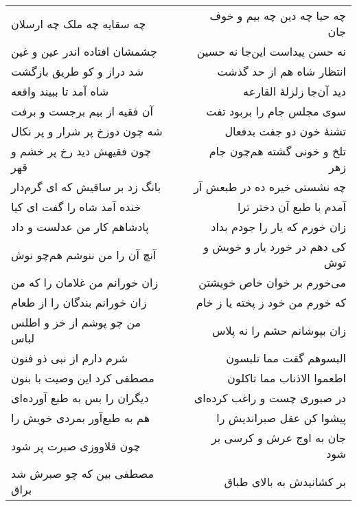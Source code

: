 \begin{center}
\begin{longtable}{l p{0.5cm} r}
چه سقایه چه ملک چه ارسلان
&&
چه حیا چه دین چه بیم و خوف جان
\\
چشمشان افتاده اندر عین و غین
&&
نه حسن پیداست این‌جا نه حسین
\\
شد دراز و کو طریق بازگشت
&&
انتظار شاه هم از حد گذشت
\\
شاه آمد تا ببیند واقعه
&&
دید آن‌جا زلزلهٔ القارعه
\\
آن فقیه از بیم برجست و برفت
&&
سوی مجلس جام را بربود تفت
\\
شه چون دوزخ پر شرار و پر نکال
&&
تشنهٔ خون دو جفت بدفعال
\\
چون فقیهش دید رخ پر خشم و قهر
&&
تلخ و خونی گشته هم‌چون جام زهر
\\
بانگ زد بر ساقیش که ای گرم‌دار
&&
چه نشستی خیره ده در طبعش آر
\\
خنده آمد شاه را گفت ای کیا
&&
آمدم با طبع آن دختر ترا
\\
پادشاهم کار من عدلست و داد
&&
زان خورم که یار را جودم بداد
\\
آنچ آن را من ننوشم هم‌چو نوش
&&
کی دهم در خورد یار و خویش و توش
\\
زان خورانم من غلامان را که من
&&
می‌خورم بر خوان خاص خویشتن
\\
زان خورانم بندگان را از طعام
&&
که خورم من خود ز پخته یا ز خام
\\
من چو پوشم از خز و اطلس لباس
&&
زان بپوشانم حشم را نه پلاس
\\
شرم دارم از نبی ذو فنون
&&
البسوهم گفت مما تلبسون
\\
مصطفی کرد این وصیت با بنون
&&
اطعموا الاذناب مما تاکلون
\\
دیگران را بس به طبع آورده‌ای
&&
در صبوری چست و راغب کرده‌ای
\\
هم به طبع‌آور بمردی خویش را
&&
پیشوا کن عقل صبراندیش را
\\
چون قلاووزی صبرت پر شود
&&
جان به اوج عرش و کرسی بر شود
\\
مصطفی بین که چو صبرش شد براق
&&
بر کشانیدش به بالای طباق
\\
\end{longtable}
\end{center}
